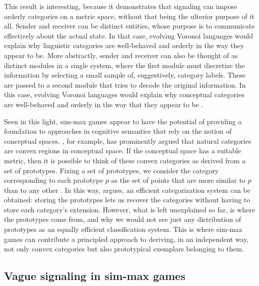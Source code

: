 This result is interesting, because it demonstrates that signaling can
impose orderly categories on a metric space, without that being the
ulterior purpose of it all. Sender and receiver can be distinct
entities, whose purpose is to communicate effectively about the actual
state. In that case, evolving Voronoi languages would explain why
linguistic categories are well-behaved and orderly in the way they
appear to be. More abstractly, sender and receiver can also be thought
of as distinct modules in a single system, where the first module must
discretize the information by selecting a small sample of,
suggestively, category labels. These are passed to a second module
that tries to decode the original information. In this case, evolving
Voronoi languages would explain why conceptual categories are
well-behaved and orderly in the way that they appear to be
\citep[e.g.][for more on this latter
interpretation]{OConnor2013:Evolving-Percep}.

Seen in this light, sim-max games appear to have the potential of
providing a foundation to approaches in cognitive semantics that rely
on the notion of conceptual spaces.
\citet[][70--77]{Gardenfors2000:Conceptual-Spac}, for example, has
prominently argued that natural categories are convex regions in
conceptual space. If the conceptual space has a suitable metric, then
it is possible to think of these convex categories as derived from a
set of prototypes. Fixing a set of prototypes, we consider the
category corresponding to each prototype $p$ as the set of points that
are more similar to $p$ than to any other
\citep[e.g.][]{OkabeBoots2000:Spatial-Tessell}. In this way,
\citet{Gardenfors2000:Conceptual-Spac} argues, an efficient
categorization system can be obtained: storing the prototypes lets us
recover the categories without having to store each category's
extension. However, what is left unexplained so far, is where the
prototypes come from, and why we would not see just any distribution
of prototypes as an equally efficient classification system. This is
where sim-max games can contribute a principled approach to deriving,
in an independent way, not only convex categories but also
prototypical exemplars belonging to them.


\subsection{Vague signaling in sim-max games}

